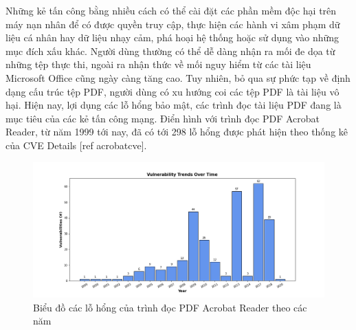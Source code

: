 \documentclass[./../main.tex]{subfiles}
\begin{document}
Những kẻ tấn công bằng nhiều cách có thể cài đặt các phần mềm độc hại trên máy nạn nhân để có được quyền truy cập, thực hiện các hành vi xâm phạm dữ liệu cá nhân hay dữ liệu nhạy cảm, phá hoại hệ thống hoặc sử dụng vào những mục đích xấu khác. Người dùng thường có thể dễ dàng nhận ra mối đe dọa từ những tệp thực thi, ngoài ra nhận thức về mối nguy hiểm từ các tài liệu Microsoft Office cũng ngày càng tăng cao. Tuy nhiên, bỏ qua sự phức tạp về định dạng cấu trúc tệp PDF, người dùng có xu hướng coi các tệp PDF là tài liệu vô hại.
Hiện nay, lợi dụng các lỗ hổng bảo mật, các trình đọc tài liệu PDF đang là mục tiêu của các kẻ tấn công mạng. Điển hình với trình đọc PDF Acrobat Reader, từ năm 1999 tới nay, đã có tới 298 lỗ hổng được phát hiện theo thống kê của CVE Details [ref acrobatcve].

\begin{figure}[ht!]
	\includegraphics[width=\linewidth]{./images/VulPerTime.png}
	\caption{Biểu đồ các lỗ hổng của trình đọc PDF Acrobat Reader theo các năm}
	\label{fig:acrobatcve}
\end{figure}
\end{document}
